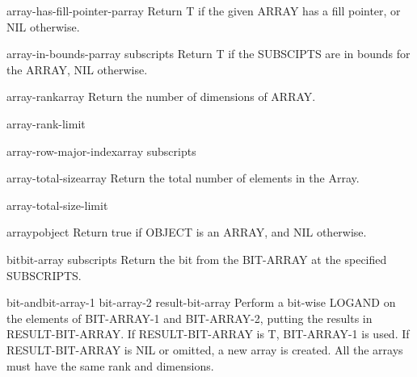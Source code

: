 \begin{function}{array-has-fill-pointer-p}{array}{}
  Return T if the given ARRAY has a fill pointer, or NIL otherwise.
\end{function}

\begin{function}{array-in-bounds-p}{array \rest subscripts}{}
  Return T if the SUBSCIPTS are in bounds for the ARRAY, NIL otherwise.
\end{function}

\begin{function}{array-rank}{array}{}
  Return the number of dimensions of ARRAY.
\end{function}

\begin{constant}{array-rank-limit}{}{}
  
\end{constant}

\begin{function}{array-row-major-index}{array \rest subscripts}{}
  
\end{function}

\begin{function}{array-total-size}{array}{}
  Return the total number of elements in the Array.
\end{function}

\begin{constant}{array-total-size-limit}{}{}
  
\end{constant}

\begin{function}{arrayp}{object}{}
  Return true if OBJECT is an ARRAY, and NIL otherwise.
\end{function}

\begin{accessor}{bit}{bit-array \rest subscripts}{}
  Return the bit from the BIT-ARRAY at the specified SUBSCRIPTS.
\end{accessor}

\begin{function}{bit-and}{bit-array-1 bit-array-2 \op result-bit-array}{}
  Perform a bit-wise LOGAND on the elements of BIT-ARRAY-1 and BIT-ARRAY-2,
  putting the results in RESULT-BIT-ARRAY. If RESULT-BIT-ARRAY is T,
  BIT-ARRAY-1 is used. If RESULT-BIT-ARRAY is NIL or omitted, a new array is
  created. All the arrays must have the same rank and dimensions.
\end{function}

